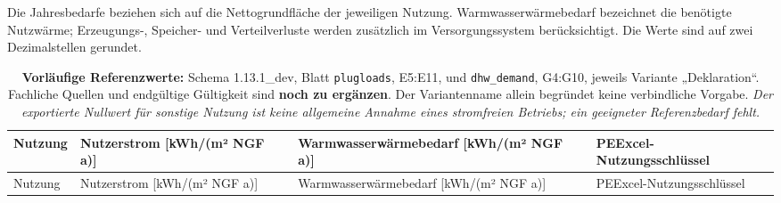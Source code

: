 \documentclass[
  ngerman,
  a4paper,
  DIV=11]{scrreprt}
\begin{document}
Die Jahresbedarfe beziehen sich auf die Nettogrundfläche der jeweiligen
Nutzung. Warmwasserwärmebedarf bezeichnet die benötigte Nutzwärme;
Erzeugungs-, Speicher- und Verteilverluste werden zusätzlich im
Versorgungssystem berücksichtigt. Die Werte sind auf zwei Dezimalstellen
gerundet.

\begin{longtable}[]{@{}
  >{\raggedright\arraybackslash}p{}
  >{\raggedleft\arraybackslash}p{}
  >{\raggedleft\arraybackslash}p{}
  >{\raggedright\arraybackslash}p{}@{}}
\caption{\textbf{Vorläufige Referenzwerte:} Schema 1.13.1\_dev, Blatt
\protect\texttt{plugloads}, E5:E11, und \protect\texttt{dhw\_demand},
G4:G10, jeweils Variante „Deklaration``. Fachliche Quellen und
endgültige Gültigkeit sind \textbf{noch zu ergänzen}. Der Variantenname
allein begründet keine verbindliche Vorgabe. \emph{Der exportierte
Nullwert für sonstige Nutzung ist keine allgemeine Annahme eines
stromfreien Betriebs; ein geeigneter Referenzbedarf
fehlt.}}\tabularnewline
\toprule\noalign{}
\begin{minipage}[b]{\linewidth}\raggedright
Nutzung
\end{minipage} & \begin{minipage}[b]{\linewidth}\raggedleft
Nutzerstrom {[}kWh/(m² NGF a){]}
\end{minipage} & \begin{minipage}[b]{\linewidth}\raggedleft
Warmwasserwärmebedarf {[}kWh/(m² NGF a){]}
\end{minipage} & \begin{minipage}[b]{\linewidth}\raggedright
PEExcel-Nutzungsschlüssel
\end{minipage} \\
\midrule\noalign{}
\endfirsthead
\toprule\noalign{}
\begin{minipage}[b]{\linewidth}\raggedright
Nutzung
\end{minipage} & \begin{minipage}[b]{\linewidth}\raggedleft
Nutzerstrom {[}kWh/(m² NGF a){]}
\end{minipage} & \begin{minipage}[b]{\linewidth}\raggedleft
Warmwasserwärmebedarf {[}kWh/(m² NGF a){]}
\end{minipage} & \begin{minipage}[b]{\linewidth}\raggedright
PEExcel-Nutzungsschlüssel
\end{minipage} \\

\end{longtable}
\end{document}
